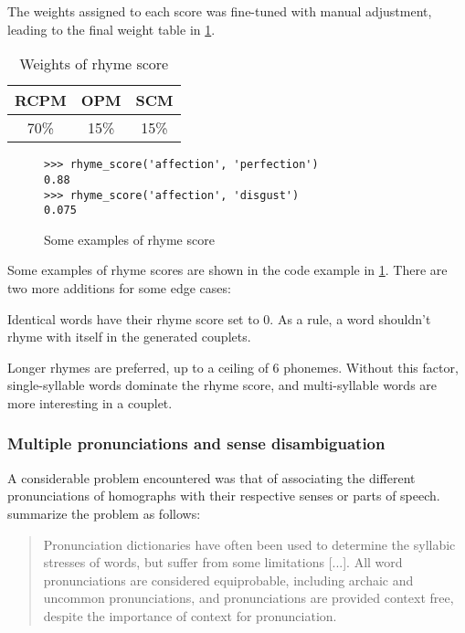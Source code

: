 \documentclass[11pt,a4paper]{article}
\newenvironment{tight_enumerate}{
\begin{enumerate}
\setlength{\itemsep}{0pt}
\setlength{\parskip}{0pt}
}{\end{enumerate}}
\begin{document}
The weights assigned to each score was fine-tuned with manual adjustment, leading to the final weight table in \ref{table:weight_rhyme_score}.

\begin{table}[ht]
\centering
\begin{tabular}{c c c}
	\hline\hline
	RCPM & OPM & SCM \\ [0.5ex]
	\hline
	70\% & 15\% & 15\% \\ [0.5ex]
	\hline
\end{tabular}
\caption{Weights of rhyme score}
\label{table:weight_rhyme_score}
\end{table}

\begin{figure}
\begin{Verbatim}[fontsize=\small]
>>> rhyme_score('affection', 'perfection')
0.88
>>> rhyme_score('affection', 'disgust')
0.075
\end{Verbatim}
\caption{Some examples of rhyme score}
\label{fig:rhymescorecode}
\end{figure}

Some examples of rhyme scores are shown in the code example in \ref{fig:rhymescorecode}. There are two more additions for some edge cases:

\begin{tight_enumerate}
	\vspace{-0.5em}
	\item
		Identical words have their rhyme score set to 0. As a rule, a word shouldn't rhyme with itself in the generated couplets.
	\item
		Longer rhymes are preferred, up to a ceiling of 6 phonemes. Without this factor, single-syllable words dominate the rhyme score, and multi-syllable words are more interesting in a couplet.
\end{tight_enumerate}

\subsubsection{Multiple pronunciations and sense disambiguation}

A considerable problem encountered was that of associating the different pronunciations of homographs with their respective senses or parts of speech. \citet{hopkins-kiela-2017} summarize the problem as follows:

\begin{quote}
Pronunciation dictionaries have often been used to determine the syllabic stresses of words, but suffer from some limitations [...]. All word pronunciations are considered equiprobable, including archaic and uncommon pronunciations, and pronunciations are provided context free, despite the importance of context for pronunciation.
\end{quote}
\end{document}
